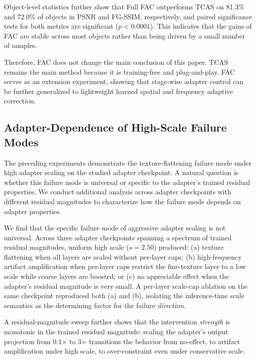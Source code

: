\documentclass[times,twocolumn,final]{elsarticle}
\begin{document}
Object-level statistics further show that Full FAC outperforms TCAS on 81.3\% and 72.0\% of objects in PSNR and FG-SSIM, respectively, and paired significance tests for both metrics are significant ($p < 0.0001$). This indicates that the gains of FAC are stable across most objects rather than being driven by a small number of samples.

Therefore, FAC does not change the main conclusion of this paper. TCAS remains the main method because it is training-free and plug-and-play. FAC serves as an extension experiment, showing that stage-wise adapter control can be further generalized to lightweight learned spatial and frequency adaptive correction.

\FloatBarrier

\subsection{Adapter-Dependence of High-Scale Failure Modes}
\label{subsec:adapterdep}

The preceding experiments demonstrate the texture-flattening failure mode under high adapter scaling on the studied adapter checkpoint. A natural question is whether this failure mode is universal or specific to the adapter's trained residual properties. We conduct additional analysis across adapter checkpoints with different residual magnitudes to characterize how the failure mode depends on adapter properties.

We find that the specific failure mode of aggressive adapter scaling is not universal. Across three adapter checkpoints spanning a spectrum of trained residual magnitudes, uniform high scale ($s = 2.50$) produced: (a) texture flattening when all layers are scaled without per-layer caps; (b) high-frequency artifact amplification when per-layer caps restrict the fine-texture layer to a low scale while coarse layers are boosted; or (c) no appreciable effect when the adapter's residual magnitude is very small. A per-layer scale-cap ablation on the same checkpoint reproduced both (a) and (b), isolating the inference-time scale semantics as the determining factor for the failure \emph{direction}.

A residual-magnitude sweep further shows that the intervention \emph{strength} is monotonic in the trained residual magnitude: scaling the adapter's output projection from 0.1$\times$ to 3$\times$ transitions the behavior from no-effect, to artifact amplification under high scale, to over-constraint even under conservative scale.
\end{document}
